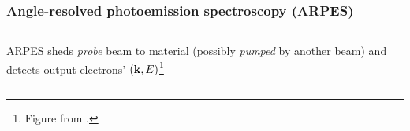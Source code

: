 \documentclass[t]{beamer}
\begin{document}
\begin{frame}
\frametitle{Angle-resolved photoemission spectroscopy (ARPES)}

\vspace{0.3cm}

\begin{columns}

\begin{column}{0.3\textwidth}
    \begin{minipage}{\columnwidth}
        ARPES sheds \emph{probe} beam to material (possibly \emph{pumped} by another beam) and detects output electrons' $(\vb{k}, E)$\footnote{
            Figure from \cite{rosenzweig2022surface}.
        }

    \end{minipage}
\end{column}

\begin{column}{0.7\textwidth}
\begin{minipage}{\columnwidth}
    \begin{center}
        \begin{tikzpicture}[x=0.75pt,y=0.75pt,yscale=-0.67,xscale=0.67]
            

\end{tikzpicture}
\end{center}
\end{minipage}
\end{column}
\end{columns}
\end{frame}
\end{document}

